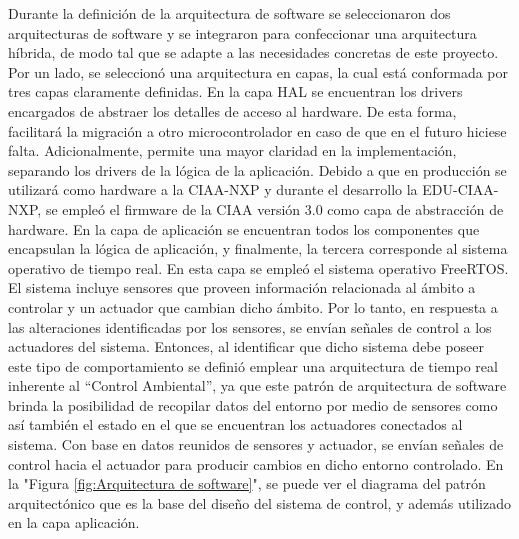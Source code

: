 Durante la definición de la arquitectura de software se seleccionaron dos arquitecturas de software y se integraron para confeccionar una arquitectura híbrida, de modo tal que se adapte a las necesidades concretas de este proyecto. Por un lado, se seleccionó una arquitectura en capas, la cual está conformada por tres capas claramente definidas.
En la capa HAL se encuentran los drivers encargados de abstraer los detalles de acceso al hardware. De esta forma, facilitará la migración a otro microcontrolador en caso de que en el futuro hiciese falta. Adicionalmente, permite una mayor claridad en la implementación, separando los drivers de la lógica de la aplicación.
Debido a que en producción se utilizará como hardware a la CIAA-NXP y durante el desarrollo la EDU-CIAA-NXP, se empleó el firmware de la CIAA versión 3.0 como capa de abstracción de hardware. 
En la capa de aplicación se encuentran todos los componentes que encapsulan la lógica de aplicación, y finalmente, la tercera corresponde al sistema operativo de tiempo real. En esta capa se empleó el sistema operativo FreeRTOS.
El sistema incluye sensores que proveen información relacionada al ámbito a controlar y un actuador que cambian dicho ámbito. Por lo tanto, en respuesta a las alteraciones identificadas por los sensores, se envían señales de control a los actuadores del sistema. Entonces, al identificar que dicho sistema debe poseer este tipo de comportamiento se definió emplear una arquitectura de tiempo real inherente al “Control Ambiental”, ya que este patrón de arquitectura de software brinda la posibilidad de recopilar datos del entorno por medio de sensores como así también el estado en el que se encuentran los actuadores  conectados al sistema. Con base en datos reunidos de sensores y actuador, se envían señales de control hacia el actuador para producir cambios en dicho entorno controlado. En la "Figura \ref{fig:Arquitectura de software}", se puede ver el diagrama del patrón arquitectónico que es la base del diseño del sistema de control, y además utilizado en la capa aplicación. 

